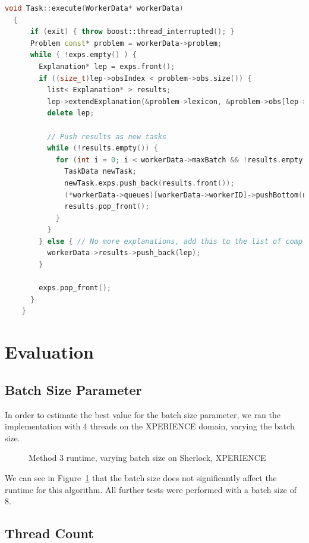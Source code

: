 \documentclass[12pt,twoside,abbrevs,msc,ai,notimes,logo,sansheadings]{infthesis}
\begin{document}
\begin{lstlisting}[language=C++]
  void Task::execute(WorkerData* workerData)
  {
      if (exit) { throw boost::thread_interrupted(); }
      Problem const* problem = workerData->problem;
      while ( !exps.empty() ) {
        Explanation* lep = exps.front();
        if ((size_t)lep->obsIndex < problem->obs.size()) {
          list< Explanation* > results;
          lep->extendExplanation(&problem->lexicon, &problem->obs[lep->obsIndex], &results);
          delete lep;

          // Push results as new tasks
          while (!results.empty()) {
            for (int i = 0; i < workerData->maxBatch && !results.empty(); ++i) {
              TaskData newTask;
              newTask.exps.push_back(results.front());
              (*workerData->queues)[workerData->workerID]->pushBottom(newTask);
              results.pop_front();
            }
          }
        } else { // No more explanations, add this to the list of completed explanations
          workerData->results->push_back(lep);
        }

        exps.pop_front();
      }
    }
  \end{lstlisting}

  
  \section{Evaluation}
  
  \subsection{Batch Size Parameter}
  
  In order to estimate the best value for the batch size parameter, we ran the implementation with 4 threads on the XPERIENCE domain, varying the batch size.
  
  \begin{figure}[!htbp]
  \begin{centering}
  \texttt{[image: \{\{images/batch-xper5-sherlock-3-1]}}}
  \par\end{centering}
  \caption{Method 3 runtime, varying batch size on Sherlock, XPERIENCE}
  \label{fig:batch-3}
  \end{figure}
  
  We can see in Figure~\ref{fig:batch-3} that the batch size does not significantly affect the runtime for this algorithm. All further tests were performed with a batch size of 8.
  
  \subsection{Thread Count}
  
\end{document}
